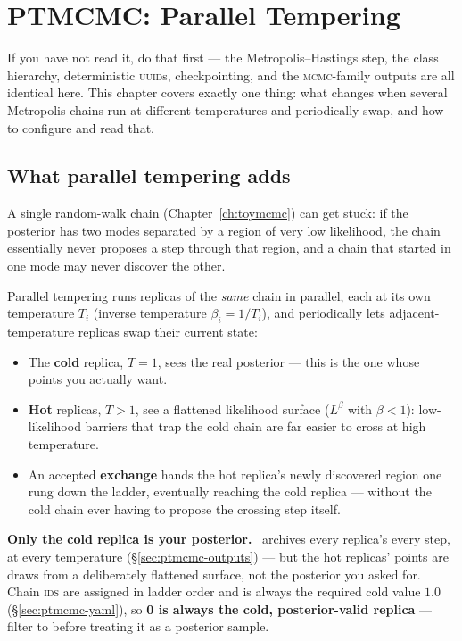 \chapter{PTMCMC: Parallel Tempering}
\label{ch:ptmcmc}

 If you have not read it,
do that first --- the Metropolis--Hastings step, the class hierarchy, deterministic
\textsc{uuid}s, checkpointing, and the \textsc{mcmc}-family outputs are all identical
here. This chapter covers exactly one thing: what changes when several Metropolis
chains run at different temperatures and periodically swap, and how to configure and
read that.

\section{What parallel tempering adds}
\label{sec:pt-what}

A single random-walk chain (Chapter~\ref{ch:toymcmc}) can get stuck: if the posterior
has two modes separated by a region of very low likelihood, the chain essentially
never proposes a step through that region, and a chain that started in one mode may
never discover the other.

Parallel tempering\cite{EarlDeem:2005} runs  replicas of the
\emph{same} chain in parallel, each at its own temperature $T_i$ (inverse temperature
$\beta_i = 1/T_i$), and periodically lets adjacent-temperature replicas swap their
current state:

\begin{itemize}
  \item The \textbf{cold} replica, $T=1$, sees the real posterior --- this is the one
        whose points you actually want.
  \item \textbf{Hot} replicas, $T>1$, see a flattened likelihood surface
        ($L^{\beta}$ with $\beta<1$): low-likelihood barriers that trap the cold chain
        are far easier to cross at high temperature.
  \item An accepted \textbf{exchange} hands the hot replica's newly discovered region
        one rung down the ladder, eventually reaching the cold replica --- without the
        cold chain ever having to propose the crossing step itself.
\end{itemize}

\begin{jwarn}
\textbf{Only the cold replica is your posterior.} \Jtwo\ archives every replica's
every step, at every temperature (\S\ref{sec:ptmcmc-outputs}) --- but the hot replicas'
points are draws from a deliberately flattened surface, not the posterior you asked
for. Chain \textsc{ids} are assigned in ladder order and
 is always the required cold value $1.0$
(\S\ref{sec:ptmcmc-yaml}), so \textbf{ 0 is always the cold,
posterior-valid replica} --- filter  to   before treating it as a posterior sample.
\end{jwarn}


